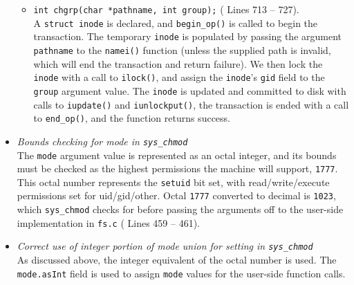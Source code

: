 \documentclass[11pt,letterpaper]{report}
\begin{document}
\begin{itemize}
\begin{itemize}
			\item {\tt int chgrp(char *pathname, int group);} ({\color{red} Lines 713 -- 727}).\\
			A {\tt struct inode} is declared, and {\tt begin\_op()} is called to begin the transaction. The temporary {\tt inode} is populated by passing the argument {\tt pathname} to the {\tt namei()} function (unless the supplied path is invalid, which will end the transaction and return failure). We then lock the {\tt inode} with a call to {\tt ilock()}, and assign the {\tt inode}'s {\tt gid} field to the {\tt group} argument value. The {\tt inode} is updated and committed to disk with calls to {\tt iupdate()} and {\tt iunlockput()}, the transaction is ended with a call to {\tt end\_op()}, and the function returns success.
		\end{itemize}
		
		\item \emph{Bounds checking for mode in {\tt sys\_chmod}}\\
		The {\tt mode} argument value is represented as an octal integer, and its bounds must be checked as the highest permissions the machine will support, {\tt 1777}. This octal number represents the {\tt setuid} bit set, with read/write/execute permissions set for uid/gid/other. Octal {\tt 1777} converted to decimal is {\tt 1023}, which {\tt sys\_chmod} checks for before passing the arguments off to the user-side implementation in {\tt fs.c} ({\color{red} Lines 459 -- 461}).
		
		\item \emph{Correct use of integer portion of mode union for setting in {\tt sys\_chmod}}\\
		As discussed above, the integer equivalent of the octal number is used. The {\tt mode.asInt} field is used to assign {\tt mode} values for the user-side function calls.
		
	\end{itemize}	
	
	
\end{document}
